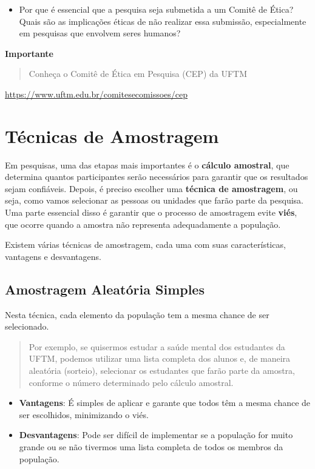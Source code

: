 \documentclass[
]{book}
\providecommand{\tightlist}{%
  \setlength{\itemsep}{0pt}\setlength{\parskip}{0pt}}
\begin{document}
\begin{enumerate}
  \begin{itemize}
  \tightlist
  \item
    Por que é essencial que a pesquisa seja submetida a um Comitê de Ética? Quais são as implicações éticas de não realizar essa submissão, especialmente em pesquisas que envolvem seres humanos?
  \end{itemize}
\end{enumerate}

\textbf{Importante}

\begin{quote}
Conheça o Comitê de Ética em Pesquisa (CEP) da UFTM
\end{quote}

\url{https://www.uftm.edu.br/comitesecomissoes/cep}

\chapter{Técnicas de Amostragem}\label{tuxe9cnicas-de-amostragem}

Em pesquisas, uma das etapas mais importantes é o \textbf{cálculo amostral}, que determina quantos participantes serão necessários para garantir que os resultados sejam confiáveis. Depois, é preciso escolher uma \textbf{técnica de amostragem}, ou seja, como vamos selecionar as pessoas ou unidades que farão parte da pesquisa. Uma parte essencial disso é garantir que o processo de amostragem evite \textbf{viés}, que ocorre quando a amostra não representa adequadamente a população.

Existem várias técnicas de amostragem, cada uma com suas características, vantagens e desvantagens.

\section{Amostragem Aleatória Simples}\label{amostragem-aleatuxf3ria-simples}

Nesta técnica, cada elemento da população tem a mesma chance de ser selecionado.

\begin{quote}
Por exemplo, se quisermos estudar a saúde mental dos estudantes da UFTM, podemos utilizar uma lista completa dos alunos e, de maneira aleatória (sorteio), selecionar os estudantes que farão parte da amostra, conforme o número determinado pelo cálculo amostral.
\end{quote}

\begin{itemize}
\tightlist
\item
  \textbf{Vantagens}: É simples de aplicar e garante que todos têm a mesma chance de ser escolhidos, minimizando o viés.
\item
  \textbf{Desvantagens}: Pode ser difícil de implementar se a população for muito grande ou se não tivermos uma lista completa de todos os membros da população.
\end{itemize}
\end{document}
